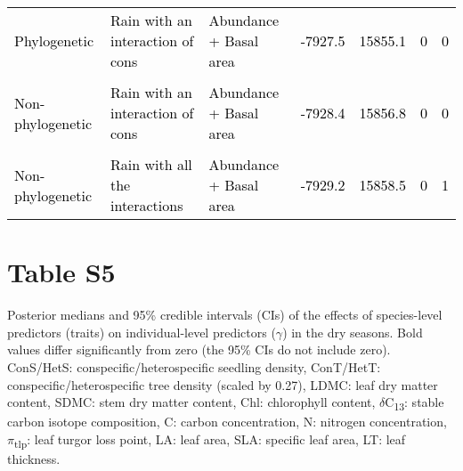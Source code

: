 \documentclass[
  12pt,
  letterpaper,
  DIV=11,
  numbers=noendperiod]{scrartcl}
\begin{document}
\begin{table}[H]
{\begin{tabular}[t]{lllllll}
\textcolor{black}{Phylogenetic} & \textcolor{black}{Rain with an interaction of cons} & \textcolor{black}{Abundance + Basal area} & \textcolor{black}{-7927.5} & \textcolor{black}{15855.1} & \textcolor{black}{0} & \textcolor{black}{0}\\
\cellcolor{gray!6}{\textcolor{black}{Phylogenetic}} & \cellcolor{gray!6}{\textcolor{black}{No rain}} & \cellcolor{gray!6}{\textcolor{black}{Abundance + Basal area}} & \cellcolor{gray!6}{\textcolor{black}{-7928.0}} & \cellcolor{gray!6}{\textcolor{black}{15856.1}} & \cellcolor{gray!6}{\textcolor{black}{0}} & \cellcolor{gray!6}{\textcolor{black}{0}}\\
\textcolor{black}{Non-phylogenetic} & \textcolor{black}{Rain with an interaction of cons} & \textcolor{black}{Abundance + Basal area} & \textcolor{black}{-7928.4} & \textcolor{black}{15856.8} & \textcolor{black}{0} & \textcolor{black}{0}\\
\cellcolor{gray!6}{\textcolor{black}{Non-phylogenetic}} & \cellcolor{gray!6}{\textcolor{black}{No rain}} & \cellcolor{gray!6}{\textcolor{black}{Abundance + Basal area}} & \cellcolor{gray!6}{\textcolor{black}{-7928.6}} & \cellcolor{gray!6}{\textcolor{black}{15857.2}} & \cellcolor{gray!6}{\textcolor{black}{0}} & \cellcolor{gray!6}{\textcolor{black}{0}}\\
\addlinespace
\textcolor{black}{Non-phylogenetic} & \textcolor{black}{Rain with all the interactions} & \textcolor{black}{Abundance + Basal area} & \textcolor{black}{-7929.2} & \textcolor{black}{15858.5} & \textcolor{black}{0} & \textcolor{black}{1}\\
\bottomrule
\end{tabular}}
\end{table}

\newpage

\hypertarget{table-s5}{%
\section{Table S5}\label{table-s5}}

Posterior medians and 95\% credible intervals (CIs) of the effects of
species-level predictors (traits) on individual-level predictors
(\(\gamma\)) in the dry seasons. Bold values differ significantly from
zero (the 95\% CIs do not include zero). ConS/HetS:
conspecific/heterospecific seedling density, ConT/HetT:
conspecific/heterospecific tree density (scaled by 0.27), LDMC: leaf dry
matter content, SDMC: stem dry matter content, Chl: chlorophyll content,
\(\delta\)C\textsubscript{13}: stable carbon isotope composition, C:
carbon concentration, N: nitrogen concentration,
\(\pi\)\textsubscript{tlp}: leaf turgor loss point, LA: leaf area, SLA:
specific leaf area, LT: leaf thickness.
\end{document}
